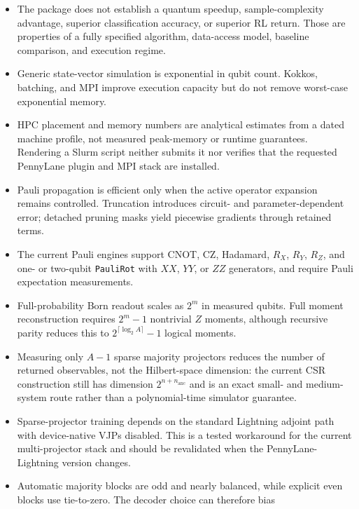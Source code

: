 \documentclass[10pt]{article}
\newcommand{\code}[1]{\texttt{#1}}
\begin{document}
\begin{itemize}
  \item The package does not establish a quantum speedup, sample-complexity
        advantage, superior classification accuracy, or superior RL return.
        Those are properties of a fully specified algorithm, data-access
        model, baseline comparison, and execution regime.
  \item Generic state-vector simulation is exponential in qubit count.  Kokkos, batching, and MPI improve execution capacity but do not remove worst-case exponential memory.
  \item HPC placement and memory numbers are analytical estimates from a
        dated machine profile, not measured peak-memory or runtime guarantees.
        Rendering a Slurm script neither submits it nor verifies that the
        requested PennyLane plugin and MPI stack are installed.
  \item Pauli propagation is efficient only when the active operator expansion remains controlled.  Truncation introduces circuit- and parameter-dependent error; detached pruning masks yield piecewise gradients through retained terms.
  \item The current Pauli engines support CNOT, CZ, Hadamard, $R_X$, $R_Y$, $R_Z$, and one- or two-qubit \code{PauliRot} with $XX$, $YY$, or $ZZ$ generators, and require Pauli expectation measurements.
  \item Full-probability Born readout scales as $2^m$ in measured qubits.  Full
        moment reconstruction requires $2^m-1$ nontrivial $Z$ moments, although
        recursive parity reduces this to $2^{\lceil\log_2A\rceil}-1$ logical
        moments.
  \item Measuring only $A-1$ sparse majority projectors reduces the number of
        returned observables, not the Hilbert-space dimension: the current CSR
        construction still has dimension $2^{n+n_{\mathrm{anc}}}$ and is an
        exact small- and medium-system route rather than a polynomial-time
        simulator guarantee.
  \item Sparse-projector training depends on the standard Lightning adjoint
        path with device-native VJPs disabled.  This is a tested workaround for
        the current multi-projector stack and should be revalidated when the
        PennyLane-Lightning version changes.
  \item Automatic majority blocks are odd and nearly balanced, while explicit
        even blocks use tie-to-zero.  The decoder choice can therefore bias

\end{itemize}
\end{document}
